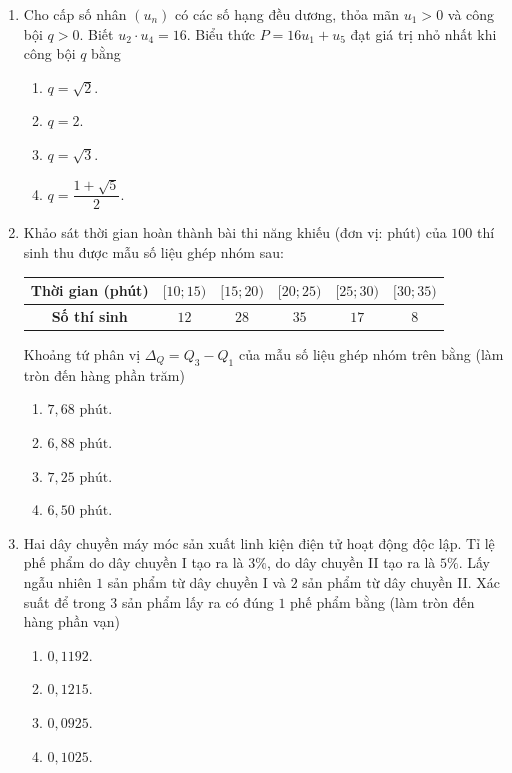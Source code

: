\documentclass[12pt,a4paper]{article}
\begin{document}
\begin{enumerate}[label=\textbf{Câu \arabic*:}, leftmargin=*]
\item Cho cấp số nhân $(u_n)$ có các số hạng đều dương, thỏa mãn $u_1 > 0$ và công bội $q > 0$. Biết $u_2 \cdot u_4 = 16$. Biểu thức $P = 16u_1 + u_5$ đạt giá trị nhỏ nhất khi công bội $q$ bằng
\begin{enumerate}[label=\Alph*.]
    \item $q = \sqrt{2}$.
    \item $q = 2$.
    \item $q = \sqrt{3}$.
    \item $q = \dfrac{1 + \sqrt{5}}{2}$.
\end{enumerate}

\item Khảo sát thời gian hoàn thành bài thi năng khiếu (đơn vị: phút) của $100$ thí sinh thu được mẫu số liệu ghép nhóm sau:
\begin{center}
\begin{tabular}{|c|c|c|c|c|c|}
\hline
\textbf{Thời gian (phút)} & $[10; 15)$ & $[15; 20)$ & $[20; 25)$ & $[25; 30)$ & $[30; 35)$ \\ \hline
\textbf{Số thí sinh} & $12$ & $28$ & $35$ & $17$ & $8$ \\ \hline
\end{tabular}
\end{center}
Khoảng tứ phân vị $\Delta_Q = Q_3 - Q_1$ của mẫu số liệu ghép nhóm trên bằng (làm tròn đến hàng phần trăm)
\begin{enumerate}[label=\Alph*.]
    \item $7{,}68\text{ phút}$.
    \item $6{,}88\text{ phút}$.
    \item $7{,}25\text{ phút}$.
    \item $6{,}50\text{ phút}$.
\end{enumerate}

\item Hai dây chuyền máy móc sản xuất linh kiện điện tử hoạt động độc lập. Tỉ lệ phế phẩm do dây chuyền I tạo ra là $3\%$, do dây chuyền II tạo ra là $5\%$. Lấy ngẫu nhiên $1$ sản phẩm từ dây chuyền I và $2$ sản phẩm từ dây chuyền II. Xác suất để trong $3$ sản phẩm lấy ra có đúng $1$ phế phẩm bằng (làm tròn đến hàng phần vạn)
\begin{enumerate}[label=\Alph*.]
    \item $0{,}1192$.
    \item $0{,}1215$.
    \item $0{,}0925$.
    \item $0{,}1025$.
\end{enumerate}


\end{enumerate}
\end{document}
